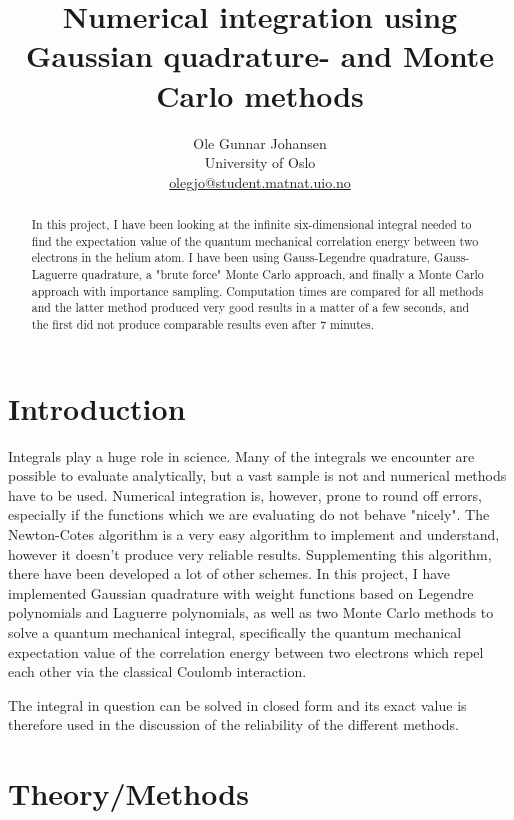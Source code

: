\documentclass[twoside, 11pt]{article}
\title{\vspace{-15mm}\fontsize{16pt}{13pt}\selectfont\textbf{Numerical integration using Gaussian quadrature- and Monte Carlo methods}} %
\author{
\large
Ole Gunnar Johansen\\[0mm]%
\normalsize University of Oslo \\[0mm] %
\normalsize \href{mailto:olegjo@ulrik.uio.no}{olegjo@student.matnat.uio.no} %
\vspace{5mm}
}
\date{}
\begin{document}
\maketitle %
\thispagestyle{fancy} %


\begin{abstract}

\noindent
In this project, I have been looking at the infinite six-dimensional integral needed to find the expectation value of the quantum mechanical correlation energy between two electrons in the helium atom. I have been using Gauss-Legendre quadrature, Gauss-Laguerre quadrature, a "brute force" Monte Carlo approach, and finally a Monte Carlo approach with importance sampling. Computation times are compared for all methods and the latter method produced very good results in a matter of a few seconds, and the first did not produce comparable results even after 7 minutes. 
\end{abstract}


\section{Introduction}
	Integrals play a huge role in science. Many of the integrals we encounter are possible to evaluate analytically, but a vast sample is not and numerical methods have to be used. Numerical integration is, however, prone to round off errors, especially if the functions which we are evaluating do not behave "nicely". The Newton-Cotes algorithm is a very easy algorithm to implement and understand, however it doesn't produce very reliable results. Supplementing this algorithm, there have been developed a lot of other schemes. In this project, I have implemented Gaussian quadrature with weight functions based on Legendre polynomials and Laguerre polynomials, as well as two Monte Carlo methods to solve a quantum mechanical integral, specifically the quantum mechanical expectation value of the correlation energy between two electrons which repel each other via the classical Coulomb interaction. 
	
	The integral in question can be solved in closed form and its exact value is therefore used in the discussion of the reliability of the different methods.

\section{Theory/Methods}
\end{document}
